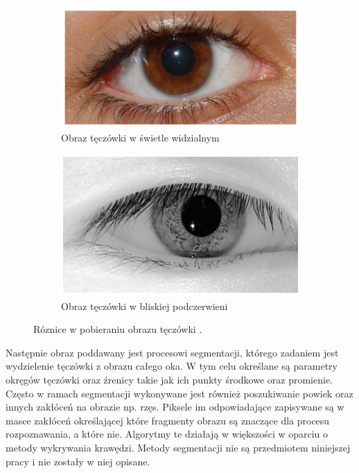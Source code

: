 \begin{figure}[ht]
  \centering
  \begin{subfigure}[b]{0.4\textwidth}
    \centering
    \includegraphics[width=\textwidth]{images/intro/eyeDaylight.png}
    \caption{Obraz tęczówki w świetle widzialnym}
  \end{subfigure}
  \begin{subfigure}[b]{0.4\textwidth}
    \centering
    \includegraphics[width=\textwidth]{images/intro/eyeInfraRed.png}
    \caption{Obraz tęczówki w bliskiej podczerwieni}
  \end{subfigure}
  \caption{Róznice w pobieraniu obrazu tęczówki \cite{IrisRecognitionPresentation}.}
  \label{fig:irisAcquisitionExample}
\end{figure}


Następnie obraz poddawany jest procesowi segmentacji, którego zadaniem jest wydzielenie tęczówki z obrazu
całego oka. W tym celu określane są parametry okręgów
tęczówki oraz \'zrenicy takie jak ich punkty środkowe oraz promienie. Często w ramach segmentacji
wykonywane jest również poszukiwanie powiek oraz innych zakłóceń na obrazie np. rzęs. Piksele im odpowiadające
zapisywane są w masce zakłóceń określającej które fragmenty obrazu są znaczące dla procesu rozpoznawania,
a które nie. Algorytmy te działają w większości w oparciu o metody wykrywania krawędzi.
Metody segmentacji nie są przedmiotem niniejszej pracy i nie zostały w niej opisane.\newline

